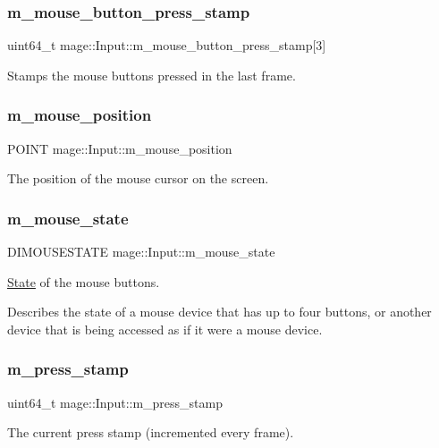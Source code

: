 \subsubsection{\texorpdfstring{m\+\_\+mouse\+\_\+button\+\_\+press\+\_\+stamp}{m\_mouse\_button\_press\_stamp}}
{\footnotesize\ttfamily uint64\+\_\+t mage\+::\+Input\+::m\+\_\+mouse\+\_\+button\+\_\+press\+\_\+stamp\mbox{[}3\mbox{]}\hspace{0.3cm}{\ttfamily [private]}}

Stamps the mouse buttons pressed in the last frame. \hypertarget{classmage_1_1_input_a28b8ec250a8d0d0efe0da713060b8599}{}\label{classmage_1_1_input_a28b8ec250a8d0d0efe0da713060b8599} 
\subsubsection{\texorpdfstring{m\+\_\+mouse\+\_\+position}{m\_mouse\_position}}
{\footnotesize\ttfamily P\+O\+I\+NT mage\+::\+Input\+::m\+\_\+mouse\+\_\+position\hspace{0.3cm}{\ttfamily [private]}}

The position of the mouse cursor on the screen. \hypertarget{classmage_1_1_input_a14b8cf407e86724f900d2c4385461cfc}{}\label{classmage_1_1_input_a14b8cf407e86724f900d2c4385461cfc} 
\subsubsection{\texorpdfstring{m\+\_\+mouse\+\_\+state}{m\_mouse\_state}}
{\footnotesize\ttfamily D\+I\+M\+O\+U\+S\+E\+S\+T\+A\+TE mage\+::\+Input\+::m\+\_\+mouse\+\_\+state\hspace{0.3cm}{\ttfamily [private]}}

\hyperlink{classmage_1_1_state}{State} of the mouse buttons.

Describes the state of a mouse device that has up to four buttons, or another device that is being accessed as if it were a mouse device. \hypertarget{classmage_1_1_input_a30ac0d05616daa4211b59d680fae6d76}{}\label{classmage_1_1_input_a30ac0d05616daa4211b59d680fae6d76} 
\subsubsection{\texorpdfstring{m\+\_\+press\+\_\+stamp}{m\_press\_stamp}}
{\footnotesize\ttfamily uint64\+\_\+t mage\+::\+Input\+::m\+\_\+press\+\_\+stamp\hspace{0.3cm}{\ttfamily [private]}}

The current press stamp (incremented every frame). 